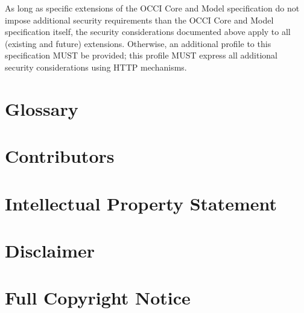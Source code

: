 \documentclass[10pt,a4paper]{article}
\begin{document}
As long as specific extensions of the OCCI Core and Model
specification do not impose additional security requirements than the
OCCI Core and Model specification itself, the security considerations
documented above apply to all (existing and future)
extensions. Otherwise, an additional profile to this specification
MUST be provided; this profile MUST express all additional security
considerations using HTTP mechanisms.

\section{Glossary}
\label{sec:glossary}

 
\section{Contributors}


\section{Intellectual Property Statement}


\section{Disclaimer}


\section{Full Copyright Notice}




\end{document}
